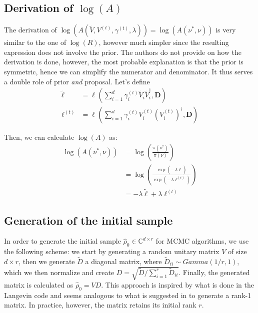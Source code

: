 \documentclass[12pt]{memoir}
\newcommand{\mb}{\mathbf}
\begin{document}
\subsection*{Derivation of $\log(A)$}

The derivation of $\log(A(\tilde V, V^{(t)}, \gamma^{(t)}, \lambda)) = \log(A(\nu^*, \nu))$ is very similar to the one of $\log(R)$, however much simpler since the resulting expression does not involve the prior. The authors do not provide on how the derivation is done, however, the most probable explanation is that the prior is symmetric, hence we can simplify the numerator and denominator. It thus serves a double role of prior \textit{and} proposal. Let's define
\begin{align}
    \tilde \ell &= \ell^{}(\sum_{i=1}^{d} \gamma_i^{(t)} \tilde V_i \tilde V_i^\dagger, \mb D)\\
    \ell^{(t)} &= \ell^{}(\sum_{i=1}^{d} \gamma_i^{(t)} V_i^{(t)} (V_i^{(t)})^\dagger, \mb D)
\end{align}

Then, we can calculate $\log(A)$ as:
\begin{align}
    \log(A(\nu^*, \nu)) &= \log(\frac{\pi(\nu^*)} {\pi(\nu) })\\
                        &= \log(\frac{\exp(-\lambda \tilde \ell)}{\exp(-\lambda \ell^{(t)})})\\
                        &= -\lambda \tilde \ell + \lambda \ell^{(t)}
\end{align}


\subsection*{Generation of the initial sample}\label{section:init-sample-gen}

In order to generate the initial sample $\hat \rho_0 \in \mathbb{C}^{d\times r}$ for MCMC algorithms, we use the following scheme: we start by generating a random unitary matrix $V$ of size $d \times r$, then we generate $\tilde D$ a diagonal matrix, where $\tilde D_{ii} \sim Gamma(1/r, 1)$, which we then normalize and create $D = \sqrt{\tilde D/\sum_{i=1}^{r} \tilde D_{ii}}$. Finally, the generated matrix is calculated as $\hat \rho_0 = V D$. This approach is inspired by what is done in the Langevin code and seems analogous to what is suggested in \cite{MA17} to generate a rank-1 matrix. In practice, however, the matrix retains its initial rank $r$.


\end{document}
